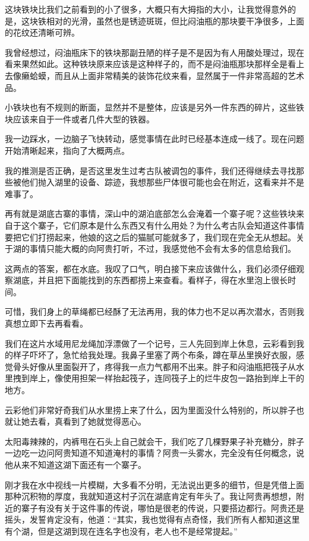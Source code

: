 这块铁块比我们之前看到的小了很多，大概只有大拇指的大小，让我觉得意外的是，这块铁相对的光滑，虽然也是锈迹斑斑，但比闷油瓶的那块要干净很多，上面的花纹还清晰可辨。

我曾经想过，闷油瓶床下的铁块那副丑陋的样子是不是因为有人用酸处理过，现在看来果然如此。这种铁块原来应该是这种样子的，而不是闷油瓶那块那样全是看上去像癞蛤蟆，而且从上面非常精美的装饰花纹来看，显然属于一件非常高超的艺术品。

小铁块也有不规则的断面，显然并不是整体，应该是另外一件东西的碎片，这些铁块应该来自于一件或者几件大型的铁器。

我一边踩水，一边脑子飞快转动，感觉事情在此时已经基本连成一线了。现在问题开始清晰起来，指向了大概两点。

我的推测是否正确，是否这里发生过考古队被调包的事件，我们还得继续去寻找那些被他们抛入湖里的设备、踪迹，我想那些尸体很可能也会在附近，这看来并不是难事了。

再有就是湖底古寨的事情，深山中的湖泊底部怎么会淹着一个寨子呢？这些铁块来自于这个寨子，它们原本是什么东西又有什么用处？为什么考古队会知道这件事情要把它们打捞起来，他娘的这之后的猫腻可能就多了，我们现在完全无从想起。关于湖的事情只能大概的向阿贵打听，不过，我感觉他不会有太多的信息给我们。

这两点的答案，都在水底。我叹了口气，明白接下来应该做什么，我们必须仔细观察湖底，并且把下面能找到的东西都捞上来查看。看样子，得在水里泡上很长时间。

可惜，我们身上的草绳都已经酥了无法再用，我的体力也不足以再次潜水，否则我真想立即下去再看看。

我们在这片水域用尼龙绳加浮漂做了一个记号，三人先回到岸上休息，云彩看到我的样子吓坏了，急忙给我处理。我鼻子里塞了两个布条，蹲在草丛里换好衣服，感觉骨头好像从里面裂开了，疼得我一点力气都用不出来。胖子和闷油瓶把筏子从水里拽到岸上，像使用担架一样抬起筏子，连同筏子上的烂牛皮包一路抬到岸上干的地方。

云彩他们非常好奇我们从水里捞上来了什么，因为里面没什么特别的，所以胖子也就让她去看，真看到了她就觉得恶心。

太阳毒辣辣的，内裤甩在石头上自己就会干，我们吃了几棵野果子补充糖分，胖子一边吃一边问阿贵知道不知道淹村的事情？阿贵一头雾水，完全没有任何概念，说他从来不知道这湖下面还有一个寨子。

刚才我在水中视线一片模糊，大多看不分明，无法说出更多的细节，但是凭借上面那种沉积物的厚度，我就知道这村子沉在湖底肯定有年头了。我让阿贵再想想，附近的寨子有没有关于这件事的传说，哪怕是很老的传说，只要搭边都行。阿贵还是摇头，发誓肯定没有，他道：“其实，我也觉得有点奇怪，我们所有人都知道这里有个湖，但是这湖到现在连名字也没有，老人也不是经常提起。”

